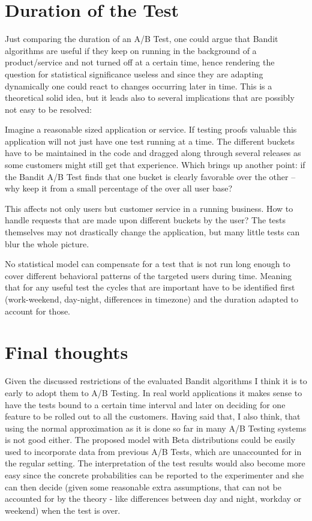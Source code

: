 \documentclass[main.tex]{subfiles}
\begin{document}
\section{Duration of the Test}
Just comparing the duration of an A/B Test, one could argue that Bandit algorithms are useful if they keep on running in the background of a product/service and not turned off at a certain time, hence rendering the question for statistical significance useless and since they are adapting dynamically one could react to changes occurring later in time. This is a theoretical solid idea, but it leads also to several implications that are possibly not easy to be resolved: 

Imagine a reasonable sized application or service. If testing proofs valuable this application will not just have one test running at a time. The different buckets have to be maintained in the code and dragged along through several releases as some customers might still get that experience. Which brings up another point: if the Bandit A/B Test finds that one bucket is clearly favorable over the other -- why keep it from a small percentage of the over all user base?

This affects not only users but customer service in a running business. How to handle requests that are made upon different buckets by the user? The tests themselves may not drastically change the application, but many little tests can blur the whole picture.

No statistical model can compensate for a test that is not run long enough to cover different behavioral patterns of the targeted users during time. Meaning that for any useful test the cycles that are important have to be identified first (work-weekend, day-night, differences in timezone) and the duration adapted to account for those.

\section{Final thoughts}
Given the discussed restrictions of the evaluated Bandit algorithms I think it is to early to adopt them to A/B Testing. In real world applications it makes sense to have the tests bound to a certain time interval and later on deciding for one feature to be rolled out to all the customers. Having said that, I also think, that using the normal approximation as it is done so far in many A/B Testing systems is not good either. The proposed model with Beta distributions could be easily used to incorporate data from previous A/B Tests, which are unaccounted for in the regular setting. The interpretation of the test results would also become more easy since the concrete probabilities can be reported to the experimenter and she can then decide (given some reasonable extra assumptions, that can not be accounted for by the theory - like differences between day and night, workday or weekend) when the test is over.

\end{document}
